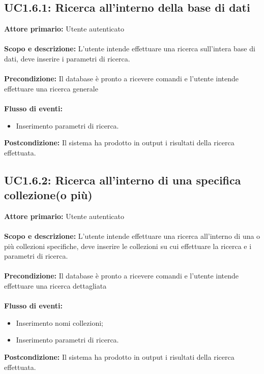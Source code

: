 \documentclass{scalatekids-article}
\begin{document}
\subsection{UC1.6.1: Ricerca all'interno della base di dati}
\textbf{Attore primario:} Utente autenticato \\ \\
\textbf{Scopo e descrizione:} L’utente intende effettuare una ricerca sull’intera base di dati, deve inserire i parametri di ricerca.\\ \\
\textbf{Precondizione:} Il database è pronto a ricevere comandi e l’utente intende effettuare una ricerca generale\\ \\
\textbf{Flusso di eventi:}
\begin{itemize}
\item Inserimento parametri di ricerca.
\end{itemize}
\textbf{Postcondizione:} Il sistema ha prodotto in output i risultati della ricerca effettuata.
\subsection{UC1.6.2: Ricerca all'interno di una specifica collezione(o più)}
\textbf{Attore primario:} Utente autenticato \\ \\
\textbf{Scopo e descrizione:} L’utente intende effettuare una ricerca all’interno di una o più collezioni specifiche, deve inserire le collezioni su cui effettuare la ricerca e i parametri di ricerca.\\ \\
\textbf{Precondizione:} Il database è pronto a ricevere comandi e l’utente intende effettuare una ricerca dettagliata\\ \\
\textbf{Flusso di eventi:}
\begin{itemize}
\item Inserimento nomi collezioni;
\item Inserimento parametri di ricerca.
\end{itemize}
\textbf{Postcondizione:} Il sistema ha prodotto in output i risultati della ricerca effettuata.
\end{document}
